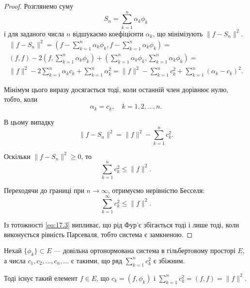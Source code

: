 \begin{proof}
Розглянемо суму
\begin{equation*}
    S_n = \sum_{k = 1}^n \alpha_k \phi_k
\end{equation*}
і для заданого числа $n$ відшукаємо коефіцієнти $\alpha_k$, що
мінімізують $\|f - S_n\|^2$.
\begin{multline*}
    \|f - S_n\|^2 =
    \left( f - \sum_{k = 1}^n \alpha_k \phi_k, f - \sum_{k = 1}^n \alpha_k \phi_k \right) = \\
    (f, f) - 2 \left( f, \sum_{k = 1}^n \alpha_k \phi_k \right) + \left( \sum_{k = 1}^n \alpha_k \phi_k, \sum_{k = 1}^n \alpha_k \phi_k \right) = \\
    \|f\|^2 - 2 \sum_{k = 1}^n \alpha_k c_k + \sum_{k = 1}^n \alpha_k^2 =
    \|f\|^2 - \sum_{k = 1}^n c_k^2 + \sum_{k = 1}^n (\alpha_k - c_k)^2.
\end{multline*}

Мінімум цього виразу досягається тоді, коли останній член
дорівнює нулю, тобто, коли
\begin{equation*}
    \alpha_k = c_k, \quad k = 1, 2, \dots, n.
\end{equation*}

В цьому випадку
\begin{equation}
    \label{eq:17.3}
    \|f - S_n\|^2 = \|f\|^2 - \sum_{k = 1}^n c_k^2.
\end{equation}

Оскільки $\|f - S_n\|^2 \ge 0$, то
\begin{equation*}
    \sum_{k = 1}^n c_k^2 \le \|f\|^2.
\end{equation*}

Переходячи до границі при $n \to \infty$, отримуємо нерівністю
Бесселя:
\begin{equation*}
    \sum_{k = 1}^\infty c_k^2 \le \|f\|^2.
\end{equation*}

Із тотожності \eqref{eq:17.3} випливає, що рід Фур’є збігається тоді і
лише тоді, коли виконується рівність Парсеваля, тобто
система є замкненою. 
\end{proof}

\begin{theorem}
 Нехай $\{\phi_k\} \subset E$ --- довільна
ортонормована система в гільбертовому просторі $E$, а
числа $c_1, c_2, \dots, c_n, \dots$ є такими, що ряд
$\sum_{k = 1}^n c_k^2$ є збіжним.

Тоді існує такий елемент $f \in E$, що $c_k = (f, \phi_k)$ і
$\sum_{k = 1}^n c_k^2 = (f, f) = \|f\|^2$.
\end{theorem}


